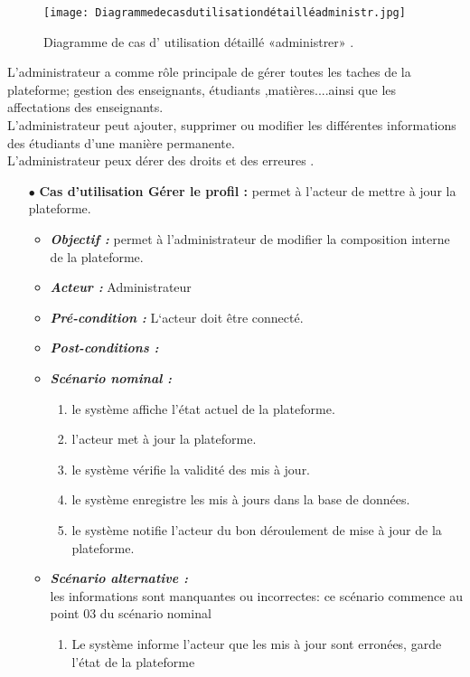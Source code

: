 \begin{figure}[ht]
	\centering
	\texttt{[image: Diagrammedecasdutilisationdétailléadministr.jpg]}
	\caption{Diagramme de cas d' utilisation  détaillé «administrer» .}
	\label{fig:Diagramme de cas d' utilisation  détaillé administrer  }
\end{figure}
\FloatBarrier

L'administrateur a comme rôle principale de gérer toutes les taches de la plateforme; gestion des enseignants, étudiants ,matières....ainsi que les affectations des
enseignants.\\
L'administrateur peut ajouter, supprimer ou modifier les différentes informations des étudiants d'une manière permanente.\\
L'administrateur peux dérer des droits et des erreures .

\begin{itemize}
      \item[$\bullet$] \textbf{Cas d’utilisation Gérer le profil :} permet à l’acteur de mettre à jour la plateforme. 
	\medskip
	\begin{itemize}
		\item \textit{\textbf{Objectif :}}  permet à l’administrateur de modifier la composition interne de la plateforme. 
		
		\item \textit{\textbf{Acteur :}} Administrateur
		
		\item \textit{\textbf{Pré-condition  :}}  L‘acteur doit être connecté.
		\item \textit{\textbf{Post-conditions   :}}
		\item \textit{\textbf{Scénario nominal :}}
		\begin{enumerate}
			\item le système affiche l’état actuel de la plateforme. 
			\item l’acteur met à jour la plateforme. 
			\item   le système vérifie la validité des mis à jour.  
			\item  le système enregistre les mis à jours dans la base de données.  
			\item le système notifie l’acteur du bon déroulement de mise à jour de la plateforme.
		\end{enumerate}
		\item \textit{\textbf{Scénario alternative :}} \\
les informations sont manquantes ou incorrectes: ce scénario commence au point 03 du
scénario nominal
		\begin{enumerate}
			\item  Le système informe l’acteur que les mis à jour sont erronées, garde l’état de la plateforme 
		\end{enumerate}
	\end{itemize}
\end{itemize}	
\bigskip





